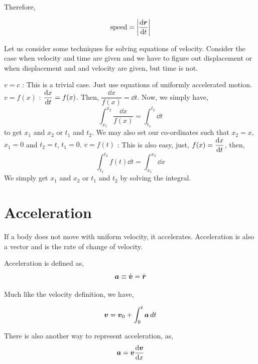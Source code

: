 Therefore, 

\[\text{speed} = \abs{\dv{\boldsymbol{r}}{t}}\]




\begin{algorithm}
    Let us consider some techniques for solving equations of velocity. Consider the case when velocity and time are given
    and we have to figure out displacement or when displacement and and velocity are given, but time is not. 
    \begin{enumerate}
        \ii \(v = c\) : This is a trivial case. Just use equations of uniformly accelerated motion.
        \ii \(v = f(x)\) : \(\displaystyle \dv{x}{t} = f(x)\). Then, \(\dfrac{\dd{x}}{f(x)} = \dd{t}\).
        Now, we simply have, \[
            \int^{x_2}_{x_1} \frac{\dd{x}}{f(x)} = \int^{t_2}_{t_1} \dd{t}
        \] to get \(x_1\) and \(x_2\) or \(t_1\) and \(t_2\). We may also set our co-ordinates such that \(x_2 = x\), \(x_1 = 0\) and \(t_2 = t\), \(t_1 = 0\).
        \ii \(v = f(t)\) : This is also easy, just, \(\displaystyle f(x) = \dv{x}{t}\), then,
        \[
            \int^{t_2}_{t_1} f(t) \dd{t} = \int^{x_2}_{x_1} \dd{x}
        \] We simply get \(x_1\) and \(x_2\) or \(t_1\) and \(t_2\) by solving the integral.
    \end{enumerate}
\end{algorithm}

\section{Acceleration}

If a body does not move with uniform velocity, it accelerates. Acceleration is also a vector and
is the rate of change of velocity.


\begin{definition}
    [Acceleration]
    \label{def: acceleration}
    Acceleration is defined as,
    \begin{equation}
        \boldsymbol{a} \equiv \dot{\boldsymbol{v}} = \ddot{\boldsymbol{r}}    
    \end{equation}
\end{definition}

Much like the velocity definition, we have,

\begin{equation}
    \boldsymbol{v} = \boldsymbol{v}_0 + \int_0^t \boldsymbol{a} \mathop{}\!{d}{t}
\end{equation}

There is also another way to represent acceleration, as, \[
    \boldsymbol{a} = \boldsymbol{v}\dv{\boldsymbol{v}}{x}
\]

